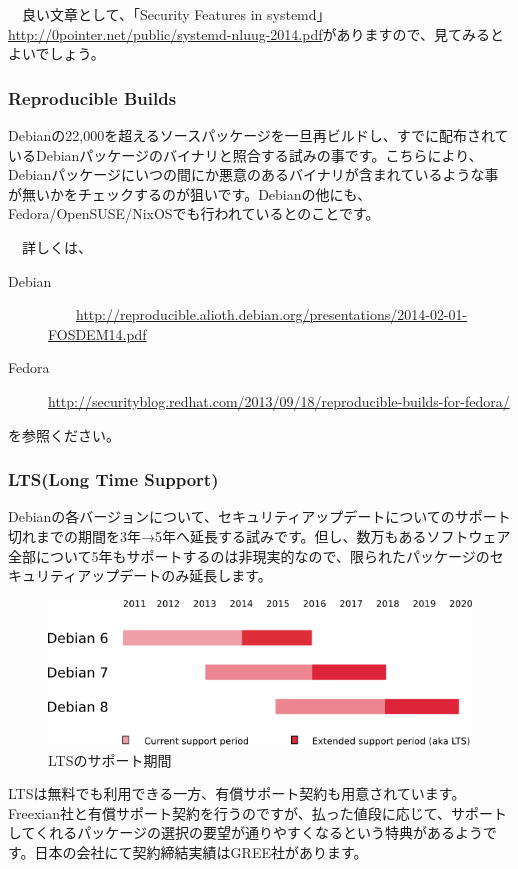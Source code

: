 \documentclass[mingoth,a4paper]{jsarticle}
\begin{document}
　良い文章として、「Security Features in systemd」\url{http://0pointer.net/public/systemd-nluug-2014.pdf}がありますので、見てみるとよいでしょう。

\subsubsection{Reproducible Builds}

 Debianの22,000を超えるソースパッケージを一旦再ビルドし、すでに配布されているDebianパッケージのバイナリと照合する試みの事です。こちらにより、Debianパッケージにいつの間にか悪意のあるバイナリが含まれているような事が無いかをチェックするのが狙いです。Debianの他にも、Fedora/OpenSUSE/NixOSでも行われているとのことです。

　詳しくは、
 \begin{description}
\item [Debian]
　　\url{http://reproducible.alioth.debian.org/presentations/2014-02-01-FOSDEM14.pdf}

\item [Fedora]
   \url{http://securityblog.redhat.com/2013/09/18/reproducible-builds-for-fedora/}
 \end{description}

を参照ください。
   
\subsubsection{LTS(Long Time Support)}

Debianの各バージョンについて、セキュリティアップデートについてのサポート切れまでの期間を3年→5年へ延長する試みです。但し、数万もあるソフトウェア全部について5年もサポートするのは非現実的なので、限られたパッケージのセキュリティアップデートのみ延長します。

\begin{figure}[H]
\begin{center}
 \includegraphics[width=0.7\hsize]{image201506/debian-lts-periods.png}
\end{center}
\caption{LTSのサポート期間}
\end{figure}

 LTSは無料でも利用できる一方、有償サポート契約も用意されています。Freexian社と有償サポート契約を行うのですが、払った値段に応じて、サポートしてくれるパッケージの選択の要望が通りやすくなるという特典があるようです。日本の会社にて契約締結実績はGREE社があります。
\end{document}
